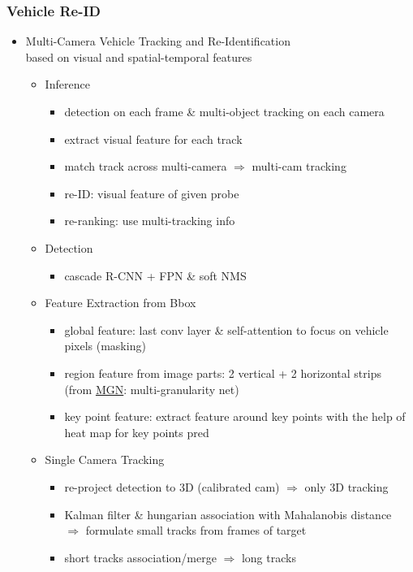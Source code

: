 \subsubsection{Vehicle Re-ID}
\begin{itemize}
\item Multi-Camera Vehicle Tracking and Re-Identification \\ 
based on visual and spatial-temporal features
	\begin{itemize}
	\item Inference
		\begin{itemize}
		\item detection on each frame \& multi-object tracking on each camera
		\item extract visual feature for each track
		\item match track across multi-camera $\Rightarrow$ multi-cam tracking
		\item re-ID: visual feature of given probe
		\item re-ranking: use multi-tracking info
		\end{itemize}
	\item Detection
		\begin{itemize}
		\item cascade R-CNN + FPN \& soft NMS
		\end{itemize}
	\item Feature Extraction from Bbox
		\begin{itemize}
		\item global feature: last conv layer \& self-attention to focus on vehicle pixels (masking)
		\item region feature from image parts: 2 vertical + 2 horizontal strips \\
		(from \hyperref[DL_CV_ReID_MGNet]{MGN}: multi-granularity net)
		\item key point feature: extract feature around key points with the help of heat map for key points pred
		\end{itemize}
	\item Single Camera Tracking
		\begin{itemize}
		\item re-project detection to 3D (calibrated cam) $\Rightarrow$ only 3D tracking
		\item Kalman filter \& hungarian association with Mahalanobis distance \\
		$\Rightarrow$ formulate small tracks from frames of target
		\item short tracks association/merge $\Rightarrow$ long tracks

\end{itemize}
\end{itemize}
\end{itemize}
